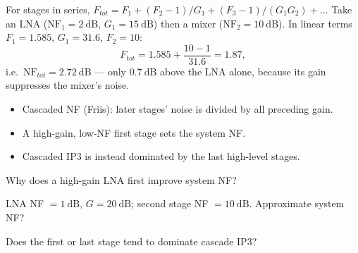 \begin{workedexample}
For stages in series,
$F_{tot} = F_1 + (F_2-1)/G_1 + (F_3-1)/(G_1 G_2) + \dots$ Take an LNA
($\text{NF}_1 = 2\ \text{dB}$, $G_1 = 15\ \text{dB}$) then a mixer
($\text{NF}_2 = 10\ \text{dB}$). In linear terms $F_1 = 1.585$, $G_1 = 31.6$,
$F_2 = 10$:
\[ F_{tot} = 1.585 + \frac{10-1}{31.6} = 1.87, \]
i.e.\ $\text{NF}_{tot} = 2.72\ \text{dB}$ --- only $0.7\ \text{dB}$ above the LNA
alone, because its gain suppresses the mixer's noise.
\end{workedexample}

\begin{keytakeaways}
\begin{itemize}[leftmargin=1.4em,itemsep=2pt]
\item Cascaded NF (Friis): later stages' noise is divided by all preceding gain.
\item A high-gain, low-NF first stage sets the system NF.
\item Cascaded IP3 is instead dominated by the last high-level stages.
\end{itemize}
\end{keytakeaways}

\begin{exercises}
\item Why does a high-gain LNA first improve system NF?
\item LNA NF $= 1\ \text{dB}$, $G = 20\ \text{dB}$; second stage NF $= 10\ \text{dB}$. Approximate system NF?
\item Does the first or last stage tend to dominate cascade IP3?
\end{exercises}


